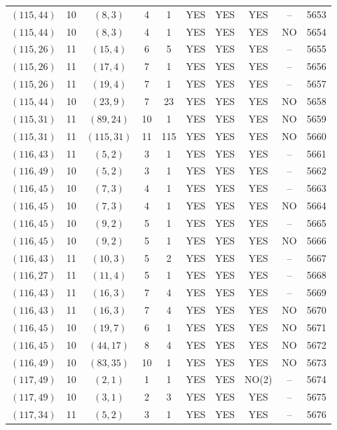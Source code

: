 \begin{longtable}{|c|c|c|c|c|c|c|c|c|c|}
$(115, 44)$ & 10 & $(8, 3)$ & 4 & 1 & YES & YES & YES & -- & 5653\\
$(115, 44)$ & 10 & $(8, 3)$ & 4 & 1 & YES & YES & YES & NO & 5654\\
$(115, 26)$ & 11 & $(15, 4)$ & 6 & 5 & YES & YES & YES & -- & 5655\\
$(115, 26)$ & 11 & $(17, 4)$ & 7 & 1 & YES & YES & YES & -- & 5656\\
$(115, 26)$ & 11 & $(19, 4)$ & 7 & 1 & YES & YES & YES & -- & 5657\\
$(115, 44)$ & 10 & $(23, 9)$ & 7 & 23 & YES & YES & YES & NO & 5658\\
$(115, 31)$ & 11 & $(89, 24)$ & 10 & 1 & YES & YES & YES & NO & 5659\\
$(115, 31)$ & 11 & $(115, 31)$ & 11 & 115 & YES & YES & YES & NO & 5660\\
$(116, 43)$ & 11 & $(5, 2)$ & 3 & 1 & YES & YES & YES & -- & 5661\\
$(116, 49)$ & 10 & $(5, 2)$ & 3 & 1 & YES & YES & YES & -- & 5662\\
$(116, 45)$ & 10 & $(7, 3)$ & 4 & 1 & YES & YES & YES & -- & 5663\\
$(116, 45)$ & 10 & $(7, 3)$ & 4 & 1 & YES & YES & YES & NO & 5664\\
$(116, 45)$ & 10 & $(9, 2)$ & 5 & 1 & YES & YES & YES & -- & 5665\\
$(116, 45)$ & 10 & $(9, 2)$ & 5 & 1 & YES & YES & YES & NO & 5666\\
$(116, 43)$ & 11 & $(10, 3)$ & 5 & 2 & YES & YES & YES & -- & 5667\\
$(116, 27)$ & 11 & $(11, 4)$ & 5 & 1 & YES & YES & YES & -- & 5668\\
$(116, 43)$ & 11 & $(16, 3)$ & 7 & 4 & YES & YES & YES & -- & 5669\\
$(116, 43)$ & 11 & $(16, 3)$ & 7 & 4 & YES & YES & YES & NO & 5670\\
$(116, 45)$ & 10 & $(19, 7)$ & 6 & 1 & YES & YES & YES & NO & 5671\\
$(116, 45)$ & 10 & $(44, 17)$ & 8 & 4 & YES & YES & YES & NO & 5672\\
$(116, 49)$ & 10 & $(83, 35)$ & 10 & 1 & YES & YES & YES & NO & 5673\\
$(117, 49)$ & 10 & $(2, 1)$ & 1 & 1 & YES & YES & NO(2) & -- & 5674\\
$(117, 49)$ & 10 & $(3, 1)$ & 2 & 3 & YES & YES & YES & -- & 5675\\
$(117, 34)$ & 11 & $(5, 2)$ & 3 & 1 & YES & YES & YES & -- & 5676\\

\end{longtable}
